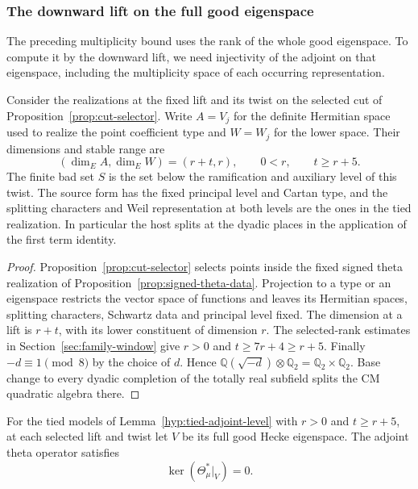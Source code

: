 \subsubsection{The downward lift on the full good eigenspace}
\label{subsec:selected-point-adjoint}

The preceding multiplicity bound uses the rank of the whole good eigenspace. To compute it by the downward lift, we need injectivity of the adjoint on that eigenspace, including the multiplicity space of each occurring representation.

\begin{established}\label{hyp:tied-adjoint-level}
Consider the realizations at the fixed lift and its twist
on the selected cut of Proposition~\ref{prop:cut-selector}. Write \(A=V_j\) for the definite
Hermitian space used to realize the point coefficient type and
\(W=W_j\) for the lower space. Their dimensions and stable range are
\[
 (\dim_E A,\dim_E W)=(r+t,r),\qquad 0<r,\qquad t\ge r+5 .
\] The finite bad set \(S\) is the
set below the ramification and auxiliary level of this twist.
The source form has the fixed principal level and Cartan type,
and the splitting characters and Weil representation at both
levels are the ones in the tied realization. In particular
the host splits at the dyadic places in the application of
the first term identity.
\end{established}
\begin{proof}
Proposition~\ref{prop:cut-selector} selects points inside the fixed signed theta realization of Proposition~\ref{prop:signed-theta-data}. Projection to a type or an eigenspace restricts the vector space of functions and leaves its Hermitian spaces, splitting characters, Schwartz data and principal level fixed. The dimension at a lift is \(r+t\), with its lower constituent of dimension \(r\). The selected-rank estimates in Section~\ref{sec:family-window} give \(r>0\) and \(t\ge7r+4\ge r+5\). Finally \(-d\equiv1\pmod 8\) by the choice of \(d\). Hence \(\mathbb Q(\sqrt{-d})\otimes\mathbb Q_2=\mathbb Q_2\times\mathbb Q_2\). Base change to every dyadic completion of the totally real subfield splits the CM quadratic algebra there.
\end{proof}

\begin{proposition}
\label{prop:downward-on-good-space}
For the tied models of Lemma~\ref{hyp:tied-adjoint-level}
with \(r>0\) and \(t\ge r+5\), at each selected lift and twist let \(V\) be its full good Hecke eigenspace. The adjoint theta operator satisfies
\[
 \ker(\Theta_\mu^*|_V)=0.
\]
\end{proposition}

